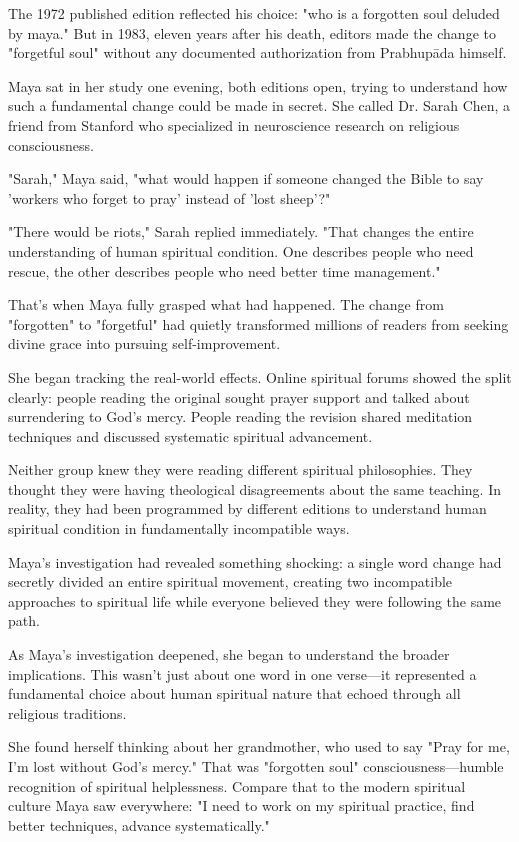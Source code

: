 \documentclass[11pt,twoside]{book}
\begin{document}
The 1972 published edition reflected his choice: "who is a forgotten soul deluded by maya." But in 1983, eleven years after his death, editors made the change to "forgetful soul" without any documented authorization from Prabhupāda himself.

Maya sat in her study one evening, both editions open, trying to understand how such a fundamental change could be made in secret. She called Dr. Sarah Chen, a friend from Stanford who specialized in neuroscience research on religious consciousness.

"Sarah," Maya said, "what would happen if someone changed the Bible to say 'workers who forget to pray' instead of 'lost sheep'?"

"There would be riots," Sarah replied immediately. "That changes the entire understanding of human spiritual condition. One describes people who need rescue, the other describes people who need better time management."

That's when Maya fully grasped what had happened. The change from "forgotten" to "forgetful" had quietly transformed millions of readers from seeking divine grace into pursuing self-improvement.

She began tracking the real-world effects. Online spiritual forums showed the split clearly: people reading the original sought prayer support and talked about surrendering to God's mercy. People reading the revision shared meditation techniques and discussed systematic spiritual advancement.

Neither group knew they were reading different spiritual philosophies. They thought they were having theological disagreements about the same teaching. In reality, they had been programmed by different editions to understand human spiritual condition in fundamentally incompatible ways.

Maya's investigation had revealed something shocking: a single word change had secretly divided an entire spiritual movement, creating two incompatible approaches to spiritual life while everyone believed they were following the same path.

As Maya's investigation deepened, she began to understand the broader implications. This wasn't just about one word in one verse—it represented a fundamental choice about human spiritual nature that echoed through all religious traditions.

She found herself thinking about her grandmother, who used to say "Pray for me, I'm lost without God's mercy." That was "forgotten soul" consciousness—humble recognition of spiritual helplessness. Compare that to the modern spiritual culture Maya saw everywhere: "I need to work on my spiritual practice, find better techniques, advance systematically."
\end{document}
